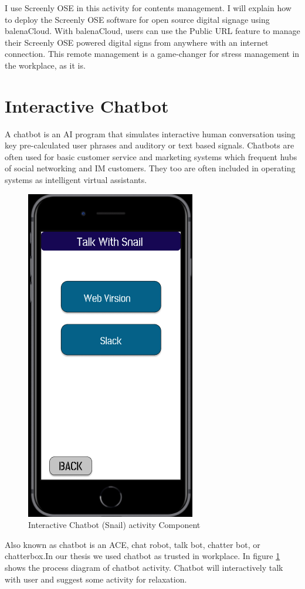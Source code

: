 I use Screenly OSE in this activity for contents management. I will explain how to deploy the Screenly OSE software for open source digital signage using balenaCloud. With balenaCloud, users can use the Public URL feature to manage their Screenly OSE powered digital signs from anywhere with an internet connection. This remote management is a game-changer for stress management in the workplace, as it is.

\section{Interactive Chatbot}
A chatbot is an \acf{AI} program that simulates interactive human conversation using key pre-calculated user phrases and auditory or text based signals. Chatbots are often used for basic customer service and marketing systems which frequent hubs of social networking and \acf{IM} customers. They too are often included in operating systems as intelligent virtual assistants.
\begin{figure}[hbt!] 
  \centering
  \includegraphics[width=0.4\linewidth]{chap4/image4/chat.png}
  \caption[Interactive Chatbot (Snail) activity Component ]{Interactive Chatbot (Snail) activity Component}
  \label{fig:chat}
\end{figure}

Also known as chatbot is an \acf{ACE}, chat robot, talk bot, chatter bot, or chatterbox.In our thesis we used chatbot as trusted in workplace. In figure \ref{fig:chat} shows the process diagram of chatbot activity. Chatbot will interactively talk with user and suggest some activity for relaxation. 

